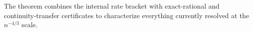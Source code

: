 The theorem combines the internal rate bracket with exact-rational and continuity-transfer certificates to characterize everything currently resolved at the \(n^{-4/3}\) scale.